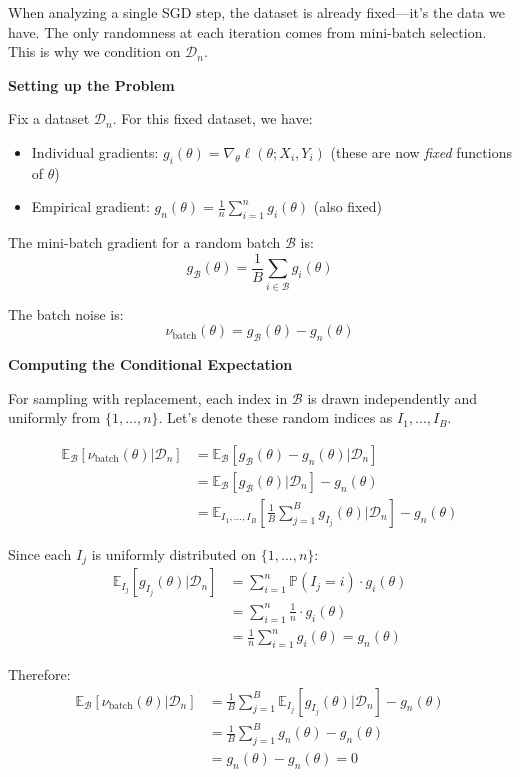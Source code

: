 \documentclass[11pt]{article}
\begin{document}
When analyzing a single SGD step, the dataset is already fixed—it's the data we have. The only randomness at each iteration comes from mini-batch selection. This is why we condition on $\mathcal{D}_n$.

\textbf{Setting up the Problem}

Fix a dataset $\mathcal{D}_n$. For this fixed dataset, we have:
\begin{itemize}
    \item Individual gradients: $g_i(\theta) = \nabla_\theta \ell(\theta; X_i, Y_i)$ (these are now \textit{fixed} functions of $\theta$)
    \item Empirical gradient: $g_n(\theta) = \frac{1}{n} \sum_{i=1}^n g_i(\theta)$ (also fixed)
\end{itemize}

The mini-batch gradient for a random batch $\mathcal{B}$ is:
$$g_{\mathcal{B}}(\theta) = \frac{1}{B} \sum_{i \in \mathcal{B}} g_i(\theta)$$

The batch noise is:
$$\nu_{\text{batch}}(\theta) = g_{\mathcal{B}}(\theta) - g_n(\theta)$$

\textbf{Computing the Conditional Expectation}

For sampling with replacement, each index in $\mathcal{B}$ is drawn independently and uniformly from $\{1, ..., n\}$. Let's denote these random indices as $I_1, ..., I_B$.

\begin{align}
\mathbb{E}_{\mathcal{B}}[\nu_{\text{batch}}(\theta) | \mathcal{D}_n] &= \mathbb{E}_{\mathcal{B}}[g_{\mathcal{B}}(\theta) - g_n(\theta) | \mathcal{D}_n] \\
&= \mathbb{E}_{\mathcal{B}}[g_{\mathcal{B}}(\theta) | \mathcal{D}_n] - g_n(\theta) \\
&= \mathbb{E}_{I_1,...,I_B}\left[\frac{1}{B} \sum_{j=1}^B g_{I_j}(\theta) \bigg| \mathcal{D}_n\right] - g_n(\theta)
\end{align}

Since each $I_j$ is uniformly distributed on $\{1, ..., n\}$:
\begin{align}
\mathbb{E}_{I_j}[g_{I_j}(\theta) | \mathcal{D}_n] &= \sum_{i=1}^n \mathbb{P}(I_j = i) \cdot g_i(\theta) \\
&= \sum_{i=1}^n \frac{1}{n} \cdot g_i(\theta) \\
&= \frac{1}{n} \sum_{i=1}^n g_i(\theta) = g_n(\theta)
\end{align}

Therefore:
\begin{align}
\mathbb{E}_{\mathcal{B}}[\nu_{\text{batch}}(\theta) | \mathcal{D}_n] &= \frac{1}{B} \sum_{j=1}^B \mathbb{E}_{I_j}[g_{I_j}(\theta) | \mathcal{D}_n] - g_n(\theta) \\
&= \frac{1}{B} \sum_{j=1}^B g_n(\theta) - g_n(\theta) \\
&= g_n(\theta) - g_n(\theta) = 0
\end{align}
\end{document}
